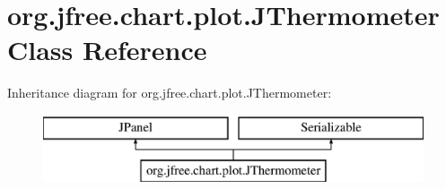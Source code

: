 \hypertarget{classorg_1_1jfree_1_1chart_1_1plot_1_1_j_thermometer}{}\section{org.\+jfree.\+chart.\+plot.\+J\+Thermometer Class Reference}
\label{classorg_1_1jfree_1_1chart_1_1plot_1_1_j_thermometer}
Inheritance diagram for org.\+jfree.\+chart.\+plot.\+J\+Thermometer\+:\begin{figure}[H]
\begin{center}
\leavevmode
\includegraphics[height=2.000000cm]{classorg_1_1jfree_1_1chart_1_1plot_1_1_j_thermometer}
\end{center}
\end{figure}
